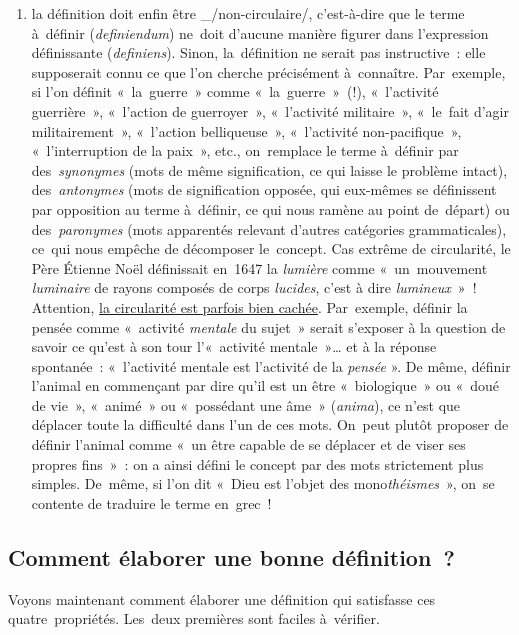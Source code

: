 \documentclass[a4paper,12pt]{report}
\begin{document}
\begin{enumerate}
\item la définition doit enfin être \_/non-circulaire/, c'est-à-dire que le
terme à définir (\emph{definiendum}​) ne doit d'aucune manière figurer dans
l'expression définissante (\emph{definiens}​). Sinon, la définition ne
serait pas instructive : elle supposerait connu ce que l'on cherche
précisément à connaître. Par exemple, si l'on définit « la guerre »
comme « la guerre » (!), « l'activité guerrière », « l'action de
guerroyer », « l'activité militaire », « le fait d'agir
militairement », « l'action belliqueuse », « l'activité
non-pacifique », « l'interruption de la paix », etc., on remplace le
terme à définir par des \emph{synonymes} (mots de même signification, ce
qui laisse le problème intact), des \emph{antonymes} (mots de
signification opposée, qui eux-mêmes se définissent par opposition au
terme à définir, ce qui nous ramène au point de départ) ou
des \emph{paronymes} (mots apparentés relevant d'autres catégories
grammaticales), ce qui nous empêche de décomposer le concept. Cas
extrême de circularité, le Père Étienne Noël définissait en 1647 la
\emph{lumière} comme « un mouvement \emph{luminaire} de rayons composés de
corps \emph{lucides}, c'est à dire \emph{lumineux}​ » ! Attention, \uline{la
circularité est parfois bien cachée}. Par exemple, définir la pensée
comme « activité \emph{mentale} du sujet » serait s'exposer à la question
de savoir ce qu'est à son tour l'« activité mentale »\ldots{} et à la
réponse spontanée : « l'activité mentale est l'activité de la
\emph{pensée} ». De même, définir l'animal en commençant par dire qu'il
est un être « biologique » ou « doué de vie », « animé » ou
« possédant une âme » (\emph{anima}​), ce n'est que déplacer toute la
difficulté dans l'un de ces mots. On peut plutôt proposer de définir
l'animal comme « un être capable de se déplacer et de viser ses
propres fins » : on a ainsi défini le concept par des mots
strictement plus simples. De même, si l'on dit « Dieu est l'objet des
mono\emph{théismes}​ », on se contente de traduire le terme en grec !
\end{enumerate}


\subsection{Comment élaborer une bonne définition ?}
\label{sec:orgcb7e3aa}

Voyons maintenant comment élaborer une définition qui satisfasse ces
quatre propriétés. Les deux premières sont faciles à vérifier.
\end{document}
